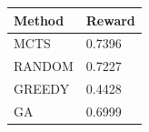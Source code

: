 \begin{tabular}{ll}
\hline
Method & Reward \\
\hline
  MCTS & 0.7396 \\
  RANDOM & 0.7227 \\
  GREEDY & 0.4428 \\
  GA & 0.6999 \\
\hline
\end{tabular}
